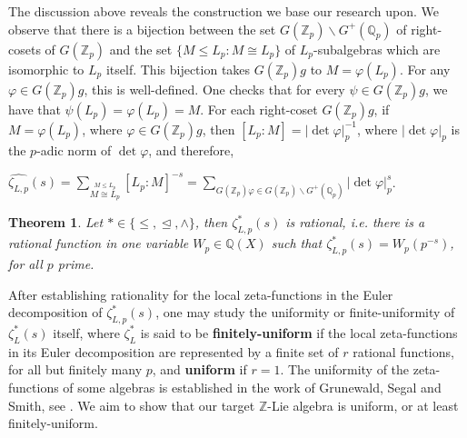 \documentclass[12pt]{article}
\newtheorem{theorem}{Theorem}[subsection]
\begin{document}
The discussion above reveals the construction we base our research upon.
We observe that there is a bijection between the set $G(\mathbb{Z}_p)\backslash G^+(\mathbb{Q}_p)$ of right-cosets of $G(\mathbb{Z}_p)$ and the set $\{M\leq L_{p} : M\cong L_{p}\}$ of $L_{p}$-subalgebras which are isomorphic to $L_{p}$ itself. This bijection takes $G(\mathbb{Z}_p)g$ to $M=\varphi(L_{p})$. For any $\varphi\in G(\mathbb{Z}_p)g$, this is well-defined. One checks that for every $\psi\in G(\mathbb{Z}_p)g$, we have that $\psi(L_{p})=\varphi(L_{p})=M$.
For each right-coset $G(\mathbb{Z}_p)g$, if $M=\varphi(L_{p})$, where $\varphi\in G(\mathbb{Z}_p)g$, then $[L_{p}:M]=|\det\varphi|_p^{-1}$, where $|\det\varphi|_p$ is the $p$-adic norm of $\det\varphi$, and therefore,\par $\hat{\zeta_{L,p}}(s)=\underset{\overset{\scriptscriptstyle M\leq L_{p}}{\scriptscriptstyle M\cong L_{p}}}{\sum}[L_{p}:M]^{-s}=\underset{\scriptscriptstyle G(\mathbb{Z}_p)\varphi\in G(\mathbb{Z}_p)\backslash G^+(\mathbb{Q}_p)}{\sum}|\det\varphi|_p^s$.
\begin{theorem}
\label{thm.rational.function}
Let $\ast\in\{\leq,\trianglelefteq,\wedge\}$, then $\zeta_{L,p}^{\ast}(s)$ is rational, i.e. there is a rational function in one variable $W_p\in\mathbb{Q}(X)$ such that $\zeta_{L,p}^{\ast}(s)=W_p(p^{-s})$, for all $p$ prime.
\end{theorem}
After establishing rationality for the local zeta-functions in the Euler decomposition of $\zeta_{L,p}^{\ast}(s)$, one may study the uniformity or finite-uniformity of $\zeta_{L}^{\ast}(s)$ itself, where $\zeta_{L}^{\ast}$ is said to be \textbf{finitely-uniform} if the local zeta-functions in its Euler decomposition are represented by a finite set of $r$ rational functions, for all but finitely many $p$, and \textbf{uniform} if $r=1$.
The uniformity of the zeta-functions of some algebras is established in the work of Grunewald, Segal and Smith, see \cite{GrunewaldSegalSmith}. We aim to show that our target $\mathbb{Z}$-Lie algebra is uniform, or at least finitely-uniform.
\end{document}
